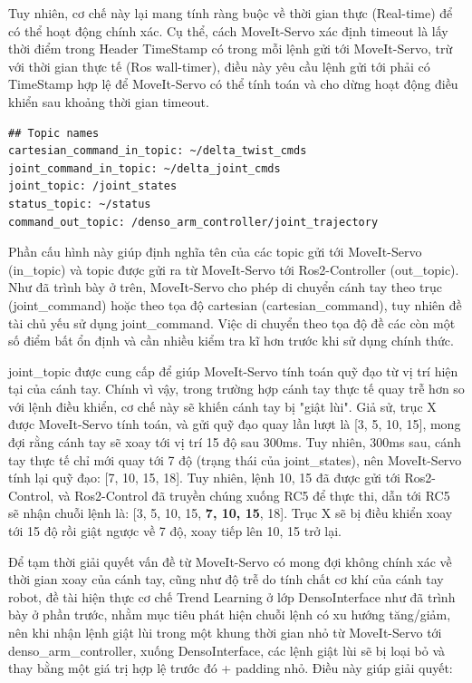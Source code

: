 Tuy nhiên, cơ chế này lại mang tính ràng buộc về thời gian thực (Real-time) để có thể hoạt động chính xác. Cụ thể, cách MoveIt-Servo xác định timeout là lấy thời điểm trong Header TimeStamp có trong mỗi lệnh gửi tới MoveIt-Servo, trừ với thời gian thực tế (Ros wall-timer), điều này yêu cầu lệnh gửi tới phải có TimeStamp hợp lệ để MoveIt-Servo có thể tính toán và cho dừng hoạt động điều khiển sau khoảng thời gian timeout. 

\begin{lstlisting}
## Topic names
cartesian_command_in_topic: ~/delta_twist_cmds  
joint_command_in_topic: ~/delta_joint_cmds
joint_topic: /joint_states
status_topic: ~/status 
command_out_topic: /denso_arm_controller/joint_trajectory 
\end{lstlisting}

Phần cấu hình này giúp định nghĩa tên của các topic gửi tới MoveIt-Servo (in\_topic) và topic được gửi ra từ MoveIt-Servo tới Ros2-Controller (out\_topic). Như đã trình bày ở trên, MoveIt-Servo cho phép di chuyển cánh tay theo trục (joint\_command) hoặc theo tọa độ cartesian (cartesian\_command), tuy nhiên đề tài chủ yếu sử dụng joint\_command. Việc di chuyển theo tọa độ đề các còn một số điểm bất ổn định và cần nhiều kiểm tra kĩ hơn trước khi sử dụng chính thức. 

joint\_topic được cung cấp để giúp MoveIt-Servo tính toán quỹ đạo từ vị trí hiện tại của cánh tay. Chính vì vậy, trong trường hợp cánh tay thực tế quay trễ hơn so với lệnh điều khiển, cơ chế này sẽ khiến cánh tay bị "giật lùi". Giả sử, trục X được MoveIt-Servo tính toán, và gửi quỹ đạo quay lần lượt là [3, 5, 10, 15], mong đợi rằng cánh tay sẽ xoay tới vị trí 15 độ sau 300ms. Tuy nhiên, 300ms sau, cánh tay thực tế chỉ mới quay tới 7 độ (trạng thái của joint\_states), nên MoveIt-Servo tính lại quỹ đạo: [7, 10, 15, 18]. Tuy nhiên, lệnh 10, 15 đã được gửi tới Ros2-Control, và Ros2-Control đã truyền chúng xuống RC5 để thực thi, dẫn tới RC5 sẽ nhận chuỗi lệnh là: [3, 5, 10, 15, \textbf{7, 10, 15}, 18]. Trục X sẽ bị điều khiển xoay tới 15 độ rồi giật ngược về 7 độ, xoay tiếp lên 10, 15 trở lại.

Để tạm thời giải quyết vấn đề từ MoveIt-Servo có mong đợi không chính xác về thời gian xoay của cánh tay, cũng như độ trễ do tính chất cơ khí của cánh tay robot, đề tài hiện thực cơ chế Trend Learning ở lớp DensoInterface như đã trình bày ở phần trước, nhằm mục tiêu phát hiện chuỗi lệnh có xu hướng tăng/giảm, nên khi nhận lệnh giật lùi trong một khung thời gian nhỏ từ MoveIt-Servo tới denso\_arm\_controller, xuống DensoInterface, các lệnh giật lùi sẽ bị loại bỏ và thay bằng một giá trị hợp lệ trước đó + padding nhỏ. Điều này giúp giải quyết:

